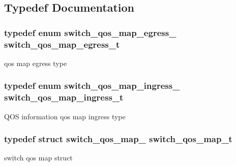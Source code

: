 \subsection{Typedef Documentation}
\hypertarget{group__QOS_gae2c7461832eaa401343e50bc7e418b83}{
\subsubsection[{switch\+\_\+qos\+\_\+map\+\_\+egress\+\_\+t}]{\setlength{\rightskip}{0pt plus 5cm}typedef enum {\bf switch\+\_\+qos\+\_\+map\+\_\+egress\+\_\+}  {\bf switch\+\_\+qos\+\_\+map\+\_\+egress\+\_\+t}}}\label{group__QOS_gae2c7461832eaa401343e50bc7e418b83}
qos map egress type \hypertarget{group__QOS_ga36b806f4d365145c9c3466c6db87383a}{
\subsubsection[{switch\+\_\+qos\+\_\+map\+\_\+ingress\+\_\+t}]{\setlength{\rightskip}{0pt plus 5cm}typedef enum {\bf switch\+\_\+qos\+\_\+map\+\_\+ingress\+\_\+}  {\bf switch\+\_\+qos\+\_\+map\+\_\+ingress\+\_\+t}}}\label{group__QOS_ga36b806f4d365145c9c3466c6db87383a}
Q\+O\+S information qos map ingress type \hypertarget{group__QOS_gaa37a048e432bfdb7113ab1c1a28f52ff}{
\subsubsection[{switch\+\_\+qos\+\_\+map\+\_\+t}]{\setlength{\rightskip}{0pt plus 5cm}typedef struct {\bf switch\+\_\+qos\+\_\+map\+\_\+}  {\bf switch\+\_\+qos\+\_\+map\+\_\+t}}}\label{group__QOS_gaa37a048e432bfdb7113ab1c1a28f52ff}
switch qos map struct 

